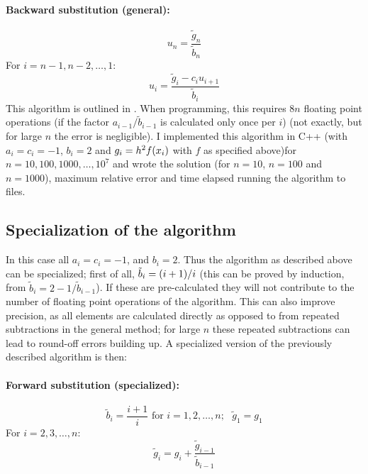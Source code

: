 \documentclass[a4paper,english]{article}
\let\originalleft\left
\let\originalright\right
\renewcommand{\left}{\mathopen{}\mathclose\bgroup\originalleft}
\renewcommand{\right}{\aftergroup\egroup\originalright}
\begin{document}
\paragraph{Backward substitution (general):}
\begin{equation}
  u_n = \frac{\tilde{g}_n}{\tilde{b}_n}
\end{equation}
For $i = n-1, n-2, \dots, 1$:
\begin{equation}
  u_i = \frac{\tilde{g}_i-c_iu_{i+1}}{\tilde{b}_i}
\end{equation}
This algorithm is outlined in \cite{LUslides}. When programming, this requires $8n$ floating point operations (if the factor $a_{i-1}/\tilde{b}_{i-1}$ is calculated only once per $i$) (not exactly, but for large $n$ the error is negligible). I implemented this algorithm in C++ (with $a_i = c_i = -1$, $b_i = 2$ and $g_i = h^2f\left(x_i\right)$ with $f$ as specified above)for $n = 10,100,1000,\dots,10^7$ and wrote the solution (for $n=10$, $n=100$ and $n=1000$), maximum relative error and time elapsed running the algorithm to files.
\subsection{Specialization of the algorithm}
In this case all $a_i = c_i = -1$, and $b_i = 2$. Thus the algorithm as described above can be specialized; first of all, $\tilde{b}_i = \left(i+1\right)/i$ (this can be proved by induction, from $\tilde{b}_i = 2-1/\tilde{b}_{i-1}$). If these are pre-calculated they will not contribute to the number of floating point operations of the algorithm. This can also improve precision, as all elements are calculated directly as opposed to from repeated subtractions in the general method; for large $n$ these repeated subtractions can lead to round-off errors building up. A specialized version of the previously described algorithm is then:
\paragraph{Forward substitution (specialized):}
\begin{equation}
  \tilde{b}_i = \frac{i+1}{i} \text{ for }i=1,2,\dots,n;\text{ }\tilde{g}_1 = g_1
\end{equation}
For $i = 2,3,\dots,n$:
\begin{equation}
  \tilde{g}_i = g_i+\frac{\tilde{g}_{i-1}}{\tilde{b}_{i-1}}
\end{equation}
\end{document}
